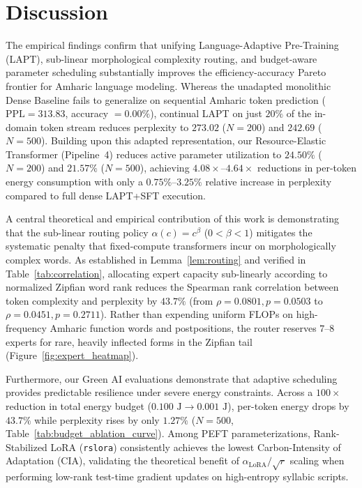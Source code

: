 \documentclass{interact}
\begin{document}
\section{Discussion}
\label{sec:discussion}

The empirical findings confirm that unifying Language-Adaptive Pre-Training (LAPT), sub-linear morphological complexity routing, and budget-aware parameter scheduling substantially improves the efficiency-accuracy Pareto frontier for Amharic language modeling. Whereas the unadapted monolithic Dense Baseline fails to generalize on sequential Amharic token prediction ($\text{PPL} = 313.83$, accuracy $= 0.00\%$), continual LAPT on just $20\%$ of the in-domain token stream reduces perplexity to $273.02$ ($N=200$) and $242.69$ ($N=500$). Building upon this adapted representation, our Resource-Elastic Transformer (Pipeline~4) reduces active parameter utilization to $24.50\%$ ($N=200$) and $21.57\%$ ($N=500$), achieving $4.08\times$--$4.64\times$ reductions in per-token energy consumption with only a $0.75\%$--$3.25\%$ relative increase in perplexity compared to full dense LAPT+SFT execution.

A central theoretical and empirical contribution of this work is demonstrating that the sub-linear routing policy $\alpha(c) = c^{\beta}$ ($0 < \beta < 1$) mitigates the systematic penalty that fixed-compute transformers incur on morphologically complex words. As established in Lemma~\ref{lem:routing} and verified in Table~\ref{tab:correlation}, allocating expert capacity sub-linearly according to normalized Zipfian word rank reduces the Spearman rank correlation between token complexity and perplexity by $43.7\%$ (from $\rho = 0.0801, p = 0.0503$ to $\rho = 0.0451, p = 0.2711$). Rather than expending uniform FLOPs on high-frequency Amharic function words and postpositions, the router reserves $7$--$8$ experts for rare, heavily inflected forms in the Zipfian tail (Figure~\ref{fig:expert_heatmap}).

Furthermore, our Green AI evaluations demonstrate that adaptive scheduling provides predictable resilience under severe energy constraints. Across a $100\times$ reduction in total energy budget ($0.100\text{ J} \to 0.001\text{ J}$), per-token energy drops by $43.7\%$ while perplexity rises by only $1.27\%$ ($N=500$, Table~\ref{tab:budget_ablation_curve}). Among PEFT parameterizations, Rank-Stabilized LoRA (\texttt{rslora}) consistently achieves the lowest Carbon-Intensity of Adaptation ($\text{CIA}$), validating the theoretical benefit of $\alpha_{\text{LoRA}}/\sqrt{r}$ scaling when performing low-rank test-time gradient updates on high-entropy syllabic scripts.
\end{document}
